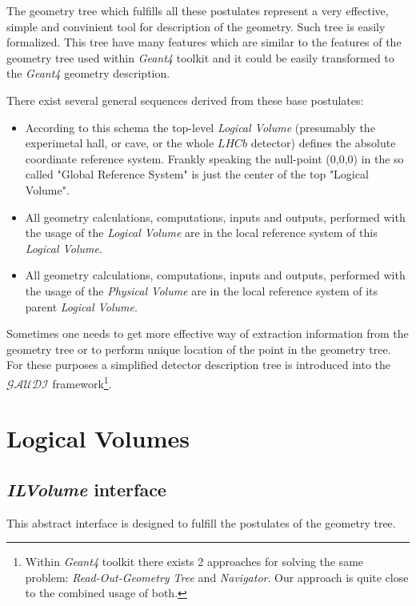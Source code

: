 The geometry tree which fulfills all these postulates  represent a very 
effective, simple and convinient tool for description of the geometry. 
Such tree is  easily formalized. This tree have many features which are similar 
to the  features of the geometry tree used within {\it Geant4} toolkit and 
it could be easily transformed to the {\it Geant4 } geometry description. 

There exist several general sequences derived from these base postulates:

\begin{itemize} 
\item 
According to this schema the top-level {\it Logical Volume} 
(presumably the experimetal hall, or cave, or the whole $LHCb$ detector) 
defines the absolute coordinate reference system. Frankly speaking
the null-point (0,0,0) in the so called "Global Reference System" is 
just the center of the top "Logical Volume".
\item 
All geometry calculations, computations, inputs and outputs, performed 
with the usage of the {\it Logical Volume} are in the local reference system of 
this {\it Logical Volume}.
\item
All geometry calculations, computations, inputs and outputs, performed 
with the usage of the {\it Physical Volume} are in the local reference system of 
its parent {\it Logical Volume}.
\end{itemize} 

Sometimes one needs to get more effective way of extraction information from 
the geometry tree or to perform unique location of the point in the  geometry 
tree. For these purposes  a simplified detector description tree is introduced 
into the ${\mathcal{GAUDI}}$ framework\footnote{Within {\it Geant4} toolkit 
there exists 2 approaches for solving the same problem: {\it Read-Out-Geometry Tree}
and {\it Navigator}. Our approach is quite close to the combined usage of both.}. 
   
  
\section{ Logical Volumes }


\subsection{ {\it ILVolume}  interface} 

This abstract interface is designed to fulfill  the postulates of the geometry tree. 

